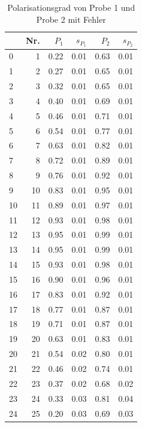 \begin{center}
    \begin{table}
    \captionsetup{justification=centering,margin=2cm}
    \centering
    \begin{tabular}{lrrrrr}
        \toprule
        {} &  Nr. &  $P_1$ &   $s_{P_1}$ & $P_2$& $s_{P_2}$ \\
        \midrule
        0  &   1 &  0.22 &  0.01 &  0.63 &  0.01 \\
        1  &   2 &  0.27 &  0.01 &  0.65 &  0.01 \\
        2  &   3 &  0.32 &  0.01 &  0.65 &  0.01 \\
        3  &   4 &  0.40 &  0.01 &  0.69 &  0.01 \\
        4  &   5 &  0.46 &  0.01 &  0.71 &  0.01 \\
        5  &   6 &  0.54 &  0.01 &  0.77 &  0.01 \\
        6  &   7 &  0.63 &  0.01 &  0.82 &  0.01 \\
        7  &   8 &  0.72 &  0.01 &  0.89 &  0.01 \\
        8  &   9 &  0.76 &  0.01 &  0.92 &  0.01 \\
        9  &  10 &  0.83 &  0.01 &  0.95 &  0.01 \\
        10 &  11 &  0.89 &  0.01 &  0.97 &  0.01 \\
        11 &  12 &  0.93 &  0.01 &  0.98 &  0.01 \\
        12 &  13 &  0.95 &  0.01 &  0.99 &  0.01 \\
        13 &  14 &  0.95 &  0.01 &  0.99 &  0.01 \\
        14 &  15 &  0.93 &  0.01 &  0.98 &  0.01 \\
        15 &  16 &  0.90 &  0.01 &  0.96 &  0.01 \\
        16 &  17 &  0.83 &  0.01 &  0.92 &  0.01 \\
        17 &  18 &  0.77 &  0.01 &  0.87 &  0.01 \\
        18 &  19 &  0.71 &  0.01 &  0.87 &  0.01 \\
        19 &  20 &  0.63 &  0.01 &  0.83 &  0.01 \\
        20 &  21 &  0.54 &  0.02 &  0.80 &  0.01 \\
        21 &  22 &  0.46 &  0.02 &  0.74 &  0.01 \\
        22 &  23 &  0.37 &  0.02 &  0.68 &  0.02 \\
        23 &  24 &  0.33 &  0.03 &  0.81 &  0.04 \\
        24 &  25 &  0.20 &  0.03 &  0.69 &  0.03 \\
        \bottomrule
    \end{tabular}
    \caption{Polarisationsgrad von Probe 1 und Probe 2 mit Fehler} 
    \label{PolarisationsgradTabelle}  
    \end{table}     
\end{center}

